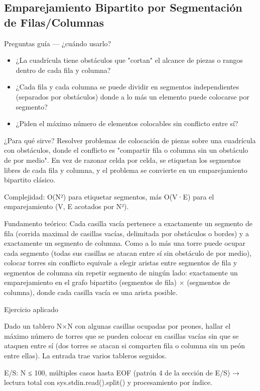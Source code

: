 \subsection{Emparejamiento Bipartito por Segmentación de Filas/Columnas}

Preguntas guía — ¿cuándo usarlo?

\begin{itemize}
\item ¿La cuadrícula tiene obstáculos que "cortan" el alcance de piezas o rangos dentro de cada fila y columna?
\item ¿Cada fila y cada columna se puede dividir en segmentos independientes (separados por obstáculos) donde a lo más un elemento puede colocarse por segmento?
\item ¿Piden el máximo número de elementos colocables sin conflicto entre sí?
\end{itemize}

¿Para qué sirve? Resolver problemas de colocación de piezas sobre una cuadrícula con obstáculos, donde el conflicto es "compartir fila o columna sin un obstáculo de por medio". En vez de razonar celda por celda, se etiquetan los segmentos libres de cada fila y columna, y el problema se convierte en un emparejamiento bipartito clásico.

Complejidad: O(N²) para etiquetar segmentos, más O(V·E) para el emparejamiento (V, E acotados por N²).

Fundamento teórico: Cada casilla vacía pertenece a exactamente un segmento de fila (corrida maximal de casillas vacías, delimitada por obstáculos o bordes) y a exactamente un segmento de columna. Como a lo más una torre puede ocupar cada segmento (todas sus casillas se atacan entre sí sin obstáculo de por medio), colocar torres sin conflicto equivale a elegir aristas entre segmentos de fila y segmentos de columna sin repetir segmento de ningún lado: exactamente un emparejamiento en el grafo bipartito (segmentos de fila) × (segmentos de columna), donde cada casilla vacía es una arista posible.

Ejercicio aplicado

Dado un tablero N×N con algunas casillas ocupadas por peones, hallar el máximo número de torres que se pueden colocar en casillas vacías sin que se ataquen entre sí (dos torres se atacan si comparten fila o columna sin un peón entre ellas). La entrada trae varios tableros seguidos.

E/S: N ≤ 100, múltiples casos hasta EOF (patrón 4 de la sección de E/S) → lectura total con sys.stdin.read().split() y procesamiento por índice.

